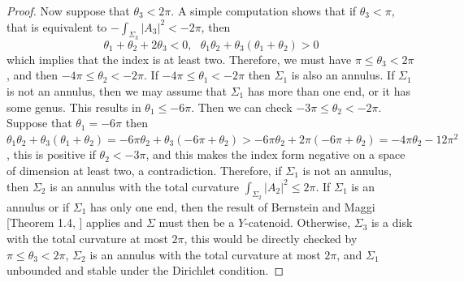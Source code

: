 \documentclass[10pt,a4paper]{amsart}
\theoremstyle{theorem}
\theoremstyle{definition}
\numberwithin{equation}{section}
\begin{document}
\begin{proof}
Now suppose that $\theta_3< 2\pi$. A simple computation shows that if $\theta_3 <\pi$, that is equivalent to $-\int_{\Sigma_3}\vert A_3\vert^2 <-2\pi$, then\\
$$
\theta_1+\theta_2+2\theta_3<0, \ \ \ \theta_1\theta_2+\theta_3(\theta_1+\theta_2)>0
$$
which implies that the index is at least two. 
Therefore, we must have $\pi \leq \theta_3 < 2\pi$, and then $-4\pi \leq \theta_2 < -2\pi$. If $-4\pi\leq \theta_1<-2\pi$ then $\Sigma_1$ is also an annulus. If $\Sigma_1$ is not an annulus, then we may assume that $\Sigma_1$ has more than one end, or it has some genus. This results in $\theta_1 \leq-6\pi$.
Then we can check $-3\pi \leq \theta_2 <-2\pi$. Suppose that $\theta_1= -6\pi$ then $\theta_1\theta_2+\theta_3(\theta_1+\theta_2)= -6\pi \theta_2 +\theta_3 (-6\pi +\theta_2)>-6\pi \theta_2 + 2\pi (-6\pi +\theta_2)=-4\pi \theta_2-12\pi^2$, this is positive if $\theta_2< -3\pi$, and this makes the index form negative on a space of dimension at least two, a contradiction. Therefore, if $\Sigma_1$ is not an annulus, then $\Sigma_2$ is an annulus with the total curvature $\int_{\Sigma_2}\vert A_2\vert^2 \leq 2\pi$. If $\Sigma_1$ is an annulus or if $\Sigma_1$ has only one end, then the result of Bernstein and Maggi [Theorem 1.4, \cite{bernstein2021symmetry}] applies and $\Sigma$ must then be a $Y$-catenoid. Otherwise, $\Sigma_3$ is a disk with the total curvature at most $2\pi$, this would be directly checked by $\pi\leq \theta_3<2\pi$, $\Sigma_2$ is an annulus with the total curvature at most $2\pi$, and $\Sigma_1$ unbounded and stable under the Dirichlet condition.
\end{proof}
\end{document}
